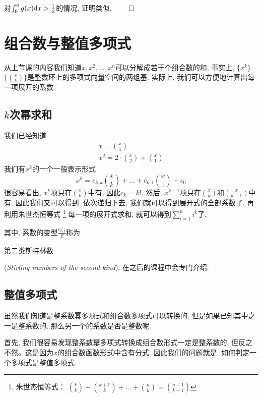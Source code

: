 \documentclass[11pt]{article}%
\renewcommand{\emph}[1]{\begin{kaishu} #1 \end{kaishu}}
\begin{document}
        对$\int_0^a g(x) {\rm d}x >\frac{1}{2}$的情况, 证明类似. \hfill$\qed$


    \section{组合数与整值多项式}
    从上节课的内容我们知道$x,x^2, \dots, x^n$可以分解成若干个组合数的和, 事实上, $\{ x^k\}$$\{ \binom{x}{k}\}$是整数环上的多项式向量空间的两组基. 实际上, 我们可以方便地计算出每一项展开的系数

    \subsection{$k$次幂求和}
    我们已经知道
    \begin{gather*}
       x=\binom{x}{1}\\
       x^2=2\cdot\binom{x}{2}+\binom{x}{1}
    \end{gather*}
    我们有$x^k$的一个一般表示形式
    \[
        x^k=c_{k,k}\binom{x}{k}+\dots+c_{k,1}\binom{x}{1}+c_0
    \]
    很容易看出, $x^k$项只在$\binom{x}{k}$中有, 因此$c_k=k!$. 然后, $x^{k-1}$项只在$\binom{x}{k}$和$\binom{x}{k-1}$中有, 因此我们又可以得到, 依次递归下去, 我们就可以得到展开式的全部系数了.
    再利用朱世杰恒等式
    \footnote{朱世杰恒等式：
        $\binom{k}{k}+\binom{k+1}{k}+\dots+\binom{n}{k}=\binom{n+1}{k+1}$
    }
    每一项的展开式求和, 就可以得到$\sum_{i=1}^n i^k$了.

    其中, 系数的变型$\frac{c_{k,j}}{j!}$称为\emph{第二类斯特林数}({\it Stirling numbers of the second kind}), 在之后的课程中会专门介绍.

    \subsection{整值多项式}
    虽然我们知道是整系数幂多项式和组合数多项式可以转换的, 但是如果已知其中之一是整系数的, 那么另一个的系数是否是整数呢.

    首先, 我们很容易发现整系数幂多项式转换成组合数形式一定是整系数的, 但反之不然。这是因为$x$的组合数函数形式中含有分式. 因此我们的问题就是, 如何判定一个多项式是整值多项式.
\end{document}
